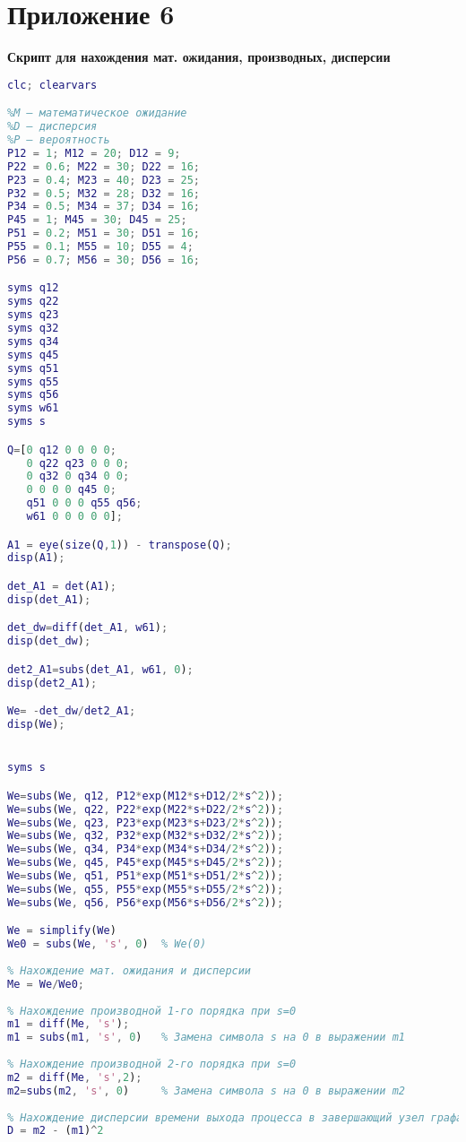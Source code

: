 \section*{Приложение 6}
\textbf{Скрипт для нахождения мат. ожидания, производных, дисперсии}
\begin{lstlisting}[language={matlab}, caption={Matlab скрипт}]
clc; clearvars

%М — математическое ожидание
%D — дисперсия
%P — вероятность
P12 = 1; M12 = 20; D12 = 9; 
P22 = 0.6; M22 = 30; D22 = 16; 
P23 = 0.4; M23 = 40; D23 = 25; 
P32 = 0.5; M32 = 28; D32 = 16; 
P34 = 0.5; M34 = 37; D34 = 16; 
P45 = 1; M45 = 30; D45 = 25; 
P51 = 0.2; M51 = 30; D51 = 16; 
P55 = 0.1; M55 = 10; D55 = 4; 
P56 = 0.7; M56 = 30; D56 = 16; 

syms q12
syms q22
syms q23
syms q32
syms q34
syms q45
syms q51
syms q55
syms q56
syms w61
syms s

Q=[0 q12 0 0 0 0;
   0 q22 q23 0 0 0;
   0 q32 0 q34 0 0;
   0 0 0 0 q45 0;
   q51 0 0 0 q55 q56;
   w61 0 0 0 0 0];

A1 = eye(size(Q,1)) - transpose(Q);
disp(A1);

det_A1 = det(A1);
disp(det_A1);

det_dw=diff(det_A1, w61);
disp(det_dw);

det2_A1=subs(det_A1, w61, 0);
disp(det2_A1);

We= -det_dw/det2_A1;
disp(We);


syms s

We=subs(We, q12, P12*exp(M12*s+D12/2*s^2));
We=subs(We, q22, P22*exp(M22*s+D22/2*s^2));
We=subs(We, q23, P23*exp(M23*s+D23/2*s^2));
We=subs(We, q32, P32*exp(M32*s+D32/2*s^2));
We=subs(We, q34, P34*exp(M34*s+D34/2*s^2));
We=subs(We, q45, P45*exp(M45*s+D45/2*s^2));
We=subs(We, q51, P51*exp(M51*s+D51/2*s^2));
We=subs(We, q55, P55*exp(M55*s+D55/2*s^2));
We=subs(We, q56, P56*exp(M56*s+D56/2*s^2));

We = simplify(We)
We0 = subs(We, 's', 0)  % We(0)
 
% Нахождение мат. ожидания и дисперсии
Me = We/We0;
 
% Нахождение производной 1-го порядка при s=0
m1 = diff(Me, 's');     
m1 = subs(m1, 's', 0)   % Замена символа s на 0 в выражении m1
 
% Нахождение производной 2-го порядка при s=0
m2 = diff(Me, 's',2);
m2=subs(m2, 's', 0)     % Замена символа s на 0 в выражении m2
 
% Нахождение дисперсии времени выхода процесса в завершающий узел графа
D = m2 - (m1)^2
\end{lstlisting}




